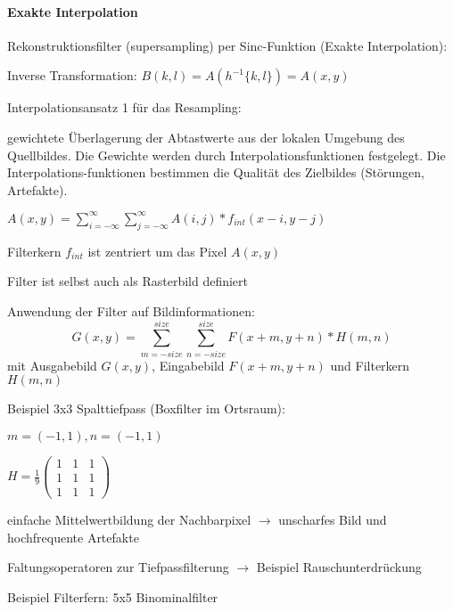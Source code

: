 \documentclass[landscape]{article}
\begin{document}
\begin{multicols}{3}
  \paragraph{Exakte Interpolation}
  Rekonstruktionsfilter (supersampling) per Sinc-Funktion (Exakte Interpolation):
  \begin{itemize*}
    \item Inverse Transformation: $B(k, l) = A(h^{-1} \{k, l\}) = A(x, y )$
    \item Interpolationsansatz 1 für das Resampling:
    \begin{itemize*}
      \item gewichtete Überlagerung der Abtastwerte aus der lokalen Umgebung des Quellbildes. Die Gewichte werden durch Interpolationsfunktionen festgelegt. Die Interpolations-funktionen bestimmen die Qualität des Zielbildes (Störungen, Artefakte).
      \item $A(x,y)=\sum_{i=-\infty}^{\infty}\sum_{j=-\infty}^{\infty}A(i,j) * f_{int}(x-i, y-j)$
      \item Filterkern $f_{int}$ ist zentriert um das Pixel $A(x, y)$
      \item Filter ist selbst auch als Rasterbild definiert
    \end{itemize*}
  \end{itemize*}
  
  Anwendung der Filter auf Bildinformationen: 
  $$G(x,y)=\sum_{m=-size}^{size} \sum_{n=-size}^{size} F(x+m, y+n) * H(m,n)$$
  mit Ausgabebild $G(x,y)$, Eingabebild $F(x+m,y+n)$ und Filterkern $H(m,n)$
  
  Beispiel 3x3 Spalttiefpass (Boxfilter im Ortsraum):
  \begin{itemize*}
    \item $m=(-1,1), n=(-1,1)$
    \item $H=\frac{1}{9} \begin{pmatrix} 1&1&1\\ 1&1&1 \\ 1&1&1 \end{pmatrix}$
    \item einfache Mittelwertbildung der Nachbarpixel $\rightarrow$ unscharfes Bild und hochfrequente Artefakte
    \item Faltungsoperatoren zur Tiefpassfilterung $\rightarrow$ Beispiel Rauschunterdrückung
  \end{itemize*}
  
  Beispiel Filterfern: 5x5 Binominalfilter
  

\end{multicols}
\end{document}

